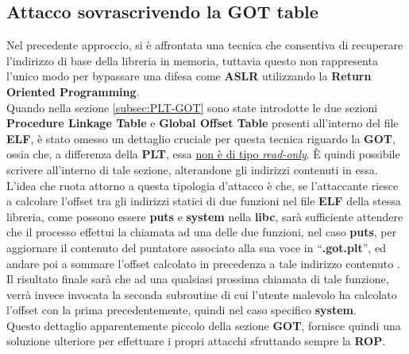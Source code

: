 \subsection*{Attacco sovrascrivendo la GOT table}
\label{subsec:Attack_3.2.2}
Nel precedente approccio, si è affrontata una tecnica che consentiva di recuperare l'indirizzo di base della libreria in memoria, tuttavia questo non rappresenta l'unico modo per bypassare una difesa come \textbf{ASLR} utilizzando la \textbf{Return Oriented Programming}.\\
Quando nella sezione \ref{subsec:PLT-GOT} sono state introdotte le due sezioni \textbf{Procedure Linkage Table} e \textbf{Global Offset Table} presenti all'interno del file \textbf{ELF}, è stato omesso un dettaglio cruciale per questa tecnica riguardo la \textbf{GOT}, ossia che, a differenza della \textbf{PLT}, essa \underline{non è di tipo \textit{read-only}}.
È quindi possibile scrivere all'interno di tale sezione, alterandone gli indirizzi contenuti in essa.\\
L'idea che ruota attorno a questa tipologia d'attacco è che, se l'attaccante riesce a calcolare l'offset tra gli indirizzi statici di due funzioni nel file \textbf{ELF} della stessa libreria, come possono essere \textbf{puts} e \textbf{system} nella \textbf{libc}, sarà sufficiente attendere che il processo effettui la chiamata ad una delle due funzioni, nel caso \textbf{puts}, per aggiornare il contenuto del puntatore associato alla sua voce in ``\textbf{.got.plt}'', ed andare poi a sommare l'offset
calcolato in precedenza a tale indirizzo contenuto \cite*{GOT-OVERWRITE}\cite*{GOT-OVERWRITE-MITIGATION}.\\
Il risultato finale sarà che ad una qualsiasi prossima chiamata di tale funzione, verrà invece invocata la seconda subroutine di cui l'utente malevolo ha calcolato l'offset con la prima precedentemente, quindi nel caso specifico \textbf{system}.\\
Questo dettaglio apparentemente piccolo della sezione \textbf{GOT}, fornisce quindi una soluzione ulteriore per effettuare i propri attacchi sfruttando sempre la \textbf{ROP}.

